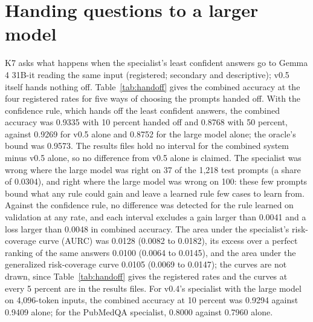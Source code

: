 \documentclass[11pt,letterpaper]{article}
\begin{document}
\begin{table}[t]
\centering\footnotesize
\caption{What the license cost (K2; registered, descriptive): each system minus v0.4's specialist on Evidence Inference 2.0's test split (1,218 prompts in 333 articles), with 95 percent intervals from 1,000 article resamples. Each is calibrated on validation: the clean systems on the 654 clean validation prompts, v0.4's on all 1,237. ECE is the expected calibration error. \textsuperscript{\dag}No difference was detected: the interval includes zero.}
\label{tab:k2}
\setlength{\tabcolsep}{3.5pt}

\end{table}

\section{Handing questions to a larger model}
\label{sec:handoff}

K7 asks what happens when the specialist's least confident answers go to Gemma 4 31B-it reading the same input (registered; secondary and descriptive); v0.5 itself hands nothing off. Table~\ref{tab:handoff} gives the combined accuracy at the four registered rates for five ways of choosing the prompts handed off. With the confidence rule, which hands off the least confident answers, the combined accuracy was 0.9335 with 10 percent handed off and 0.8768 with 50 percent, against 0.9269 for v0.5 alone and 0.8752 for the large model alone; the oracle's bound was 0.9573. The results files hold no interval for the combined system minus v0.5 alone, so no difference from v0.5 alone is claimed. The specialist was wrong where the large model was right on 37 of the 1,218 test prompts (a share of 0.0304), and right where the large model was wrong on 100: these few prompts bound what any rule could gain and leave a learned rule few cases to learn from. Against the confidence rule, no difference was detected for the rule learned on validation at any rate, and each interval excludes a gain larger than 0.0041 and a loss larger than 0.0048 in combined accuracy. The area under the specialist's risk-coverage curve (AURC) was 0.0128 (0.0082 to 0.0182), its excess over a perfect ranking of the same answers 0.0100 (0.0064 to 0.0145), and the area under the generalized risk-coverage curve 0.0105 (0.0069 to 0.0147); the curves are not drawn, since Table~\ref{tab:handoff} gives the registered rates and the curves at every 5 percent are in the results files. For v0.4's specialist with the large model on 4,096-token inputs, the combined accuracy at 10 percent was 0.9294 against 0.9409 alone; for the PubMedQA specialist, 0.8000 against 0.7960 alone.
\end{document}
